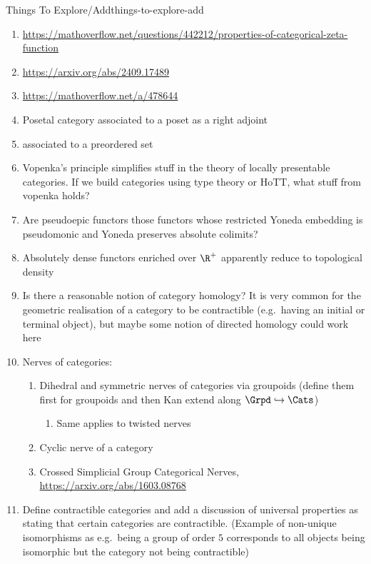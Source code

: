 \begin{remark}{Things To Explore/Add}{things-to-explore-add}
\begin{enumerate}
        \item \url{https://mathoverflow.net/questions/442212/properties-of-categorical-zeta-function}
        \item \url{https://arxiv.org/abs/2409.17489}
        \item \url{https://mathoverflow.net/a/478644}
        \item Posetal category associated to a poset as a right adjoint
        \item {} associated to a preordered set
        \item Vopenka's principle simplifies stuff in the theory of locally presentable categories. If we build categories using type theory or HoTT, what stuff from vopenka holds?
        \item Are pseudoepic functors those functors whose restricted Yoneda embedding is pseudomonic and Yoneda preserves absolute colimits?
        \item Absolutely dense functors enriched over $\R^{+}$ apparently reduce to topological density
        \item Is there a reasonable notion of category homology? It is very common for the geometric realisation of a category to be contractible (e.g.\ having an initial or terminal object), but maybe some notion of directed homology could work here
        \item Nerves of categories:
            \begin{enumerate}
                \item Dihedral and symmetric nerves of categories via groupoids (define them first for groupoids and then Kan extend along $\Grpd\hookrightarrow\Cats$)
                    \begin{enumerate}
                        \item Same applies to twisted nerves
                    \end{enumerate}
                \item Cyclic nerve of a category
                \item Crossed Simplicial Group Categorical Nerves, \url{https://arxiv.org/abs/1603.08768}
            \end{enumerate}
        \item Define contractible categories and add a discussion of universal properties as stating that certain categories are contractible. (Example of non-unique isomorphisms as e.g.\ being a group of order $5$ corresponds to all objects being isomorphic but the category not being contractible)

\end{enumerate}
\end{remark}

